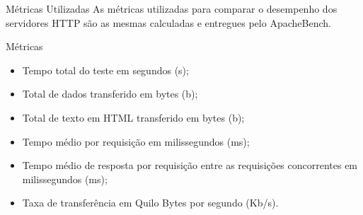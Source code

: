 \begin{frame}{Métricas Utilizadas}
	As métricas utilizadas para comparar o desempenho dos servidores HTTP são 
	as mesmas calculadas e entregues pelo ApacheBench.
	\begin{block}{Métricas}
		\begin{itemize}
			\item Tempo total do teste em segundos (s);
			\item Total de dados transferido em bytes (b);
			\item Total de texto em HTML transferido em bytes (b);
			\item Tempo médio por requisição em milissegundos (ms);
			\item Tempo médio de resposta por requisição entre as requisições 
			concorrentes em milissegundos (ms);
			\item Taxa de transferência em Quilo Bytes por segundo (Kb/s).
		\end{itemize}
	\end{block}
\end{frame}